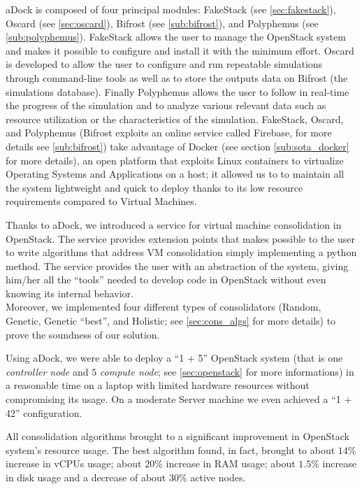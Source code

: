 aDock is composed of four principal modules: FakeStack (see \ref{sec:fakestack}), Oscard (see \ref{sec:oscard}), Bifrost (see \ref{sub:bifrost}), and Polyphemus (see \ref{sub:polyphemus}).
FakeStack allows the user to manage the OpenStack system and makes it possible to configure and install it with the minimum effort. Oscard is developed to allow the user to configure and run repeatable simulations through command-line tools as well as to store the outputs data on Bifrost (the simulations database).
Finally Polyphemus allows the user to follow in real-time the progress of the simulation and to analyze various relevant data such as resource utilization or the characteristics of the simulation.
FakeStack, Oscard, and Polyphemus (Bifrost exploits an online service called Firebase, for more details see \ref{sub:bifrost}) take advantage of Docker (see section \ref{sub:sota_docker} for more details), an open platform that exploits Linux containers to virtualize Operating Systems and Applications on a host; it allowed us to to maintain all the system lightweight and quick to deploy thanks to its low resource requirements compared to Virtual Machines.

Thanks to aDock, we introduced a service for virtual machine consolidation in OpenStack. The service provides extension points that makes possible to the user to write algorithms that address VM consolidation simply implementing a python method. The service provides the user with an abstraction of the system, giving him/her all the ``tools'' needed to develop code in OpenStack without even knowing its internal behavior.\\
Moreover, we implemented four different types of consolidators (Random, Genetic, Genetic ``best'', and Holistic; see \ref{sec:cons_algs} for more details) to prove the soundness of our solution.

Using aDock, we were able to deploy a ``1 + 5'' OpenStack system (that is one \textit{controller node} and $5$ \textit{compute node}; see \ref{sec:openstack} for more informations) in a reasonable time on a laptop with limited hardware resources without compromising its usage. On a moderate Server machine we even achieved a ``1 + 42'' configuration.

All consolidation algorithms brought to a significant improvement in OpenStack system's resource usage. The best algorithm found, in fact, brought to about $14\%$ increase in vCPUs usage; about $20\%$ increase in RAM usage; about $1.5\%$ increase in disk usage and a decrease of about $30\%$ active nodes.

